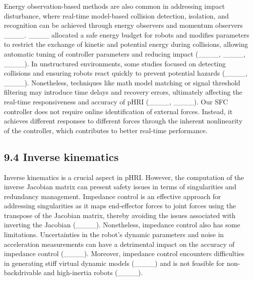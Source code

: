 
Energy observation-based methods are also common in addressing impact disturbance, where real-time model-based collision detection, isolation, and recognition can be achieved through energy observers and momentum observers ____. ____ allocated a safe energy budget for robots and modifies parameters to restrict the exchange of kinetic and potential energy during collisions, allowing automatic tuning of controller parameters and reducing impact (____, ____, ____). In unstructured environments, some studies focused on detecting collisions and ensuring robots react quickly to prevent potential hazards (____, ____). Nonetheless, techniques like math model matching or signal threshold filtering may introduce time delays and recovery errors, ultimately affecting the real-time responsiveness and accuracy of pHRI (____, ____). Our SFC controller does not require online identification of external forces. Instead, it achieves different responses to different forces through the inherent nonlinearity of the controller, which contributes to better real-time performance.

\subsection{9.4 Inverse kinematics}
Inverse kinematics is a crucial aspect in pHRI. However, the computation of the inverse Jacobian matrix can present safety issues in terms of singularities and redundancy management. Impedance control is an effective approach for addressing singularities as it maps end-effector forces to joint forces using the transpose of the Jacobian matrix, thereby avoiding the issues associated with inverting the Jacobian (____). Nonetheless, impedance control also has some limitations. Uncertainties in the robot's dynamic parameters and noise in acceleration measurements can have a detrimental impact on the accuracy of impedance control (____). Moreover, impedance control encounters difficulties in generating stiff virtual dynamic models (____) and is not feasible for non-backdrivable and high-inertia robots (____). 

